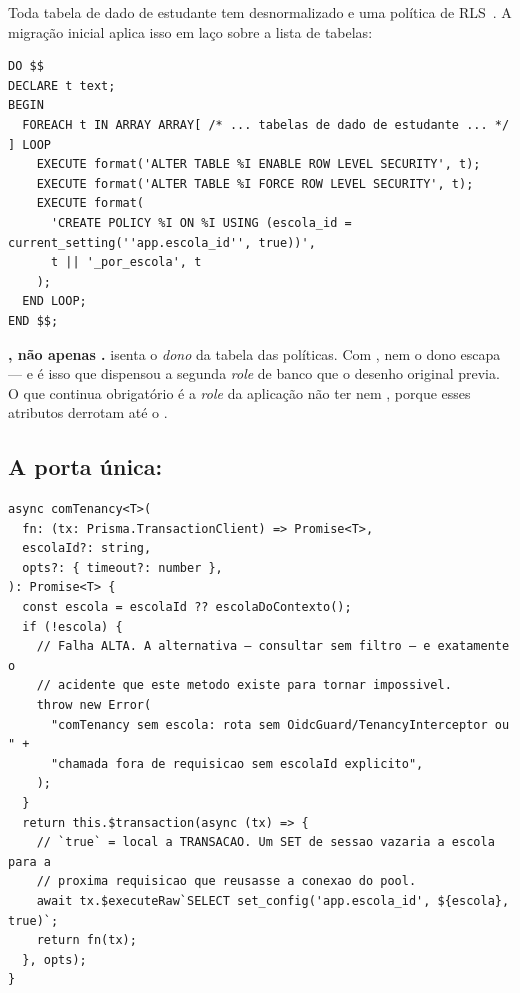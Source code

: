 Toda tabela de dado de estudante tem  desnormalizado e
uma política de RLS~\cite{postgresrls}. A migração inicial aplica isso em laço
sobre a lista de tabelas:

\begin{lstlisting}[language=sqlunoo, caption={Aplicação da RLS na migração inicial}, label={lst:rls}]
DO $$
DECLARE t text;
BEGIN
  FOREACH t IN ARRAY ARRAY[ /* ... tabelas de dado de estudante ... */ ] LOOP
    EXECUTE format('ALTER TABLE %I ENABLE ROW LEVEL SECURITY', t);
    EXECUTE format('ALTER TABLE %I FORCE ROW LEVEL SECURITY', t);
    EXECUTE format(
      'CREATE POLICY %I ON %I USING (escola_id = current_setting(''app.escola_id'', true))',
      t || '_por_escola', t
    );
  END LOOP;
END $$;
\end{lstlisting}

\begin{decisao}
\textbf{, não apenas .} 
isenta o \emph{dono} da tabela das políticas. Com , nem o dono escapa
--- e é isso que dispensou a segunda \emph{role} de banco que o desenho original
previa. O que continua obrigatório é a \emph{role} da aplicação não ter
 nem , porque esses atributos derrotam até o
.
\end{decisao}

\subsection{A porta única: }

\begin{lstlisting}[language=tsunoo, caption={A única porta de acesso ao banco (\arq{src/prisma/prisma.service.ts})}, label={lst:comtenancy}]
async comTenancy<T>(
  fn: (tx: Prisma.TransactionClient) => Promise<T>,
  escolaId?: string,
  opts?: { timeout?: number },
): Promise<T> {
  const escola = escolaId ?? escolaDoContexto();
  if (!escola) {
    // Falha ALTA. A alternativa — consultar sem filtro — e exatamente o
    // acidente que este metodo existe para tornar impossivel.
    throw new Error(
      "comTenancy sem escola: rota sem OidcGuard/TenancyInterceptor ou " +
      "chamada fora de requisicao sem escolaId explicito",
    );
  }
  return this.$transaction(async (tx) => {
    // `true` = local a TRANSACAO. Um SET de sessao vazaria a escola para a
    // proxima requisicao que reusasse a conexao do pool.
    await tx.$executeRaw`SELECT set_config('app.escola_id', ${escola}, true)`;
    return fn(tx);
  }, opts);
}
\end{lstlisting}

